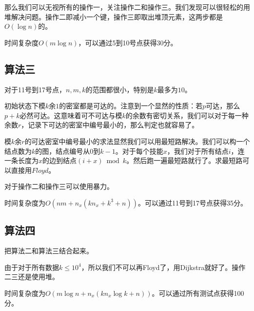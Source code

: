 \documentclass[11pt, a4paper]{article}
\begin{document}
那么我们可以无视所有的操作一，关注操作二和操作三。我们发现可以很轻松的用堆解决问题。操作二即减小一个键，操作三即取出堆顶元素，这两步都是$O(\log n)$的。

时间复杂度$O(m \log n)$，可以通过5到10号点获得30分。

\subsection*{算法三}
对于11号到17号点，$n, m, k$的范围都很小，特别是$k$最多为$10$。

初始状态下模$k$余$1$的密室都是可达的。注意到一个显然的性质：若$p$可达，那么$p + k$必然可达。这意味着可不可达与模$k$的余数有密切关系，我们可以对于每一种余数$r$，记录下可达的密室中编号最小的，那么判定也就容易了。

模$k$余$r$的可达密室中编号最小的求法显然我们可以用最短路解决。我们可以构一个结点数为$k$的图，结点编号从$0$到$k - 1$。对于每个技能$x$，我们对于所有结点$i$，连一条长度为$x$的边到结点$(i + x) \bmod k$。然后跑一遍最短路就行了。求最短路可以直接用$Floyd$。

对于操作二和操作三可以使用暴力。

时间复杂度为$O(nm + n_x (k n_x + k^3 + n))$。可以通过11号到17号点获得35分。

\subsection*{算法四}
把算法二和算法三结合起来。

由于对于所有数据$k \leq 10^4$，所以我们不可以再Floyd了，用Dijkstra就好了。操作二三还是使用堆。

时间复杂度为$O(m \log n + n_x(k n_x \log k + n))$。可以通过所有测试点获得100分。
\end{document}
